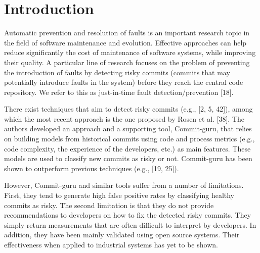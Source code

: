 \documentclass[sigconf]{acmart}
\begin{document}



\vspace{1.5cm}

\maketitle


\vspace{1.5cm}
\section{Introduction}\label{sec:introduction}

Automatic prevention and resolution of faults is an important research
topic in the field of software maintenance and evolution. Effective
approaches can help reduce significantly the cost of maintenance of
software systems, while improving their quality. A particular line of
research focuses on the problem of preventing the introduction of faults
by detecting risky commits (commits that may potentially introduce
faults in the system) before they reach the central code repository. We
refer to this as just-in-time fault detection/prevention [18].

There exist techniques that aim to detect risky commits (e.g., [2, 5,
42]), among which the most recent approach is the one proposed by
Rosen et al. [38]. The authors developed an approach and a
supporting tool, Commit-guru, that relies on building models from
historical commits using code and process metrics (e.g., code
complexity, the experience of the developers, etc.) as main features.
These models are used to classify new commits as risky or not.
Commit-guru has been shown to outperform previous techniques (e.g.,
[19, 25]).

However, Commit-guru and similar tools suffer from a number of
limitations. First, they tend to generate high false positive rates by
classifying healthy commits as risky. The second limitation is that they
do not provide recommendations to developers on how to fix the detected
risky commits. They simply return measurements that are often difficult
to interpret by developers. In addition, they have been mainly validated
using open source systems. Their effectiveness when applied to
industrial systems has yet to be shown.
\end{document}
